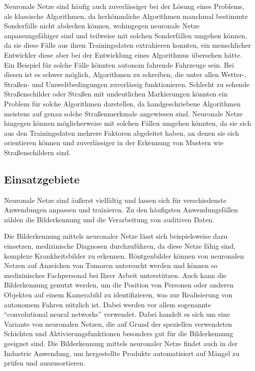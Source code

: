 \bigbreak\noindent
Neuronale Netze sind häufig auch zuverlässiger bei der Lösung eines Problems, als klassische Algorithmen, da herkömmliche Algorithmen manchmal bestimmte Sonderfälle nicht abdecken können, wohingegen neuronale Netze anpassungsfähiger sind und teilweise mit solchen Sonderfällen umgehen können, da sie diese Fälle aus ihren Trainingsdaten extrahieren konnten, ein menschlicher Entwickler diese aber bei der Entwicklung eines Algorithmus übersehen hätte.
Ein Beispiel für solche Fälle könnten autonom fahrende Fahrzeuge sein.
Bei diesen ist es schwer möglich, Algorithmen zu schreiben, die unter allen Wetter-, Straßen- und Umweltbedingungen zuverlässig funktionieren.
Schlecht zu sehende Straßenschilder oder Straßen mit undeutlichen Markierungen könnten ein Problem für solche Algorithmen darstellen, da handgeschriebene Algorithmen meistens auf genau solche Straßenmerkmale angewiesen sind.
Neuronale Netze hingegen können möglicherweise mit solchen Fällen umgehen könnten, da sie sich aus den Trainingsdaten mehrere Faktoren abgeleitet haben, an denen sie sich orientieren können und zuverlässiger in der Erkennung von Mustern wie Straßenschildern sind.

\subsection{Einsatzgebiete}\label{subsec:einleitung_nn:einsatzgebiete}
Neuronale Netze sind äußerst vielfältig und lassen sich für verschiedenste Anwendungen anpassen und trainieren.
Zu den häufigsten Anwendungsfällen zählen die Bilderkennung und die Verarbeitung von auditiven Daten.

\bigbreak\noindent
Die Bilderkennung mittels neuronaler Netze lässt sich beispielsweise dazu einsetzen, medizinische Diagnosen durchzuführen, da diese Netze fähig sind, komplexe Krankheitsbilder zu erkennen.
Röntgenbilder können von neuronalen Netzen auf Anzeichen von Tumoren untersucht werden und können so medizinisches Fachpersonal bei Ihrer Arbeit unterstützen.
Auch kann die Bilderkennung genutzt werden, um die Position von Personen oder anderen Objekten auf einem Kamerabild zu identifizieren, was zur Realisierung von autonomem Fahren nützlich ist.
Dabei werden vor allem sogenannte “convolutional neural networks” verwendet.
Dabei handelt es sich um eine Variante von neuronalen Netzen, die auf Grund der speziellen verwendeten Schichten und Aktivierungsfunktionen besonders gut für die Bilderkennung geeignet sind.
Die Bilderkennung mittels neuronaler Netze findet auch in der Industrie Anwendung, um hergestellte Produkte automatisiert auf Mängel zu prüfen und auszusortieren.


